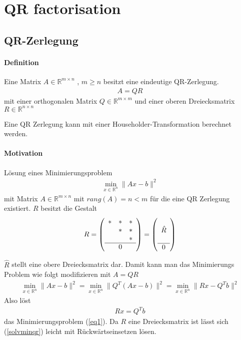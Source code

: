 \chapter{QR factorisation}

\section{QR-Zerlegung}
\subsubsection{Definition}
Eine Matrix $A \in \mathbb{R}^{m \times n}$ , $m \ge n$ besitzt eine eindeutige QR-Zerlegung.
\begin{align}
	A = QR
\end{align}
mit einer orthogonalen Matrix $ Q \in \mathbb{R}^{m \times m} $ und einer oberen Dreiecksmatrix $ R \in \mathbb{R}^{n \times n}$ \cite{num1}

Eine QR Zerlegung kann mit einer Householder-Transformation berechnet werden.

\subsubsection{Motivation}
Lösung eines Minimierungsproblem
\begin{align}
	\min_{x \in \mathbb{R}^n} \|Ax-b\|^2 \label{eq1}
\end{align}
mit Matrix $A \in \mathbb{R}^{m\times n}$ mit $rang(A) = n < m$ für die eine QR Zerlegung existiert.
$R$ besitzt die Gestalt 
\begin{align*}
	R=	
	\left(\begin{array}{ccc}
		*&*&* \\ 
		&*&* \\ 
		& &* \\ \hline
		& 0 &
	\end{array} \right)
	=
	\left(\begin{array}{c}
	 \\ 
	\hat{R} \\ 
	 \\ \hline
	0
	\end{array} \right) 
\end{align*}

$\hat{R}$ stellt eine obere Dreiecksmatrix dar.
Damit kann man das Minimierungs Problem wie folgt modifizieren mit $A=QR$
\begin{align}
		\min_{x \in \mathbb{R}^n} \|Ax-b\|^2 =
		\min_{x \in \mathbb{R}^n} \|Q^T(Ax-b)\|^2 =
		\min_{x \in \mathbb{R}^n} \|Rx-Q^Tb\|^2
\end{align}
Also löst
\begin{align}
Rx=Q^Tb \label{solvminqr}
\end{align}
das Minimierungsproblem (\ref{eq1}). Da $R$ eine Dreiecksmatrix ist lässt sich (\ref{solvminqr}) leicht mit Rückwärtseinsetzen  lösen.


